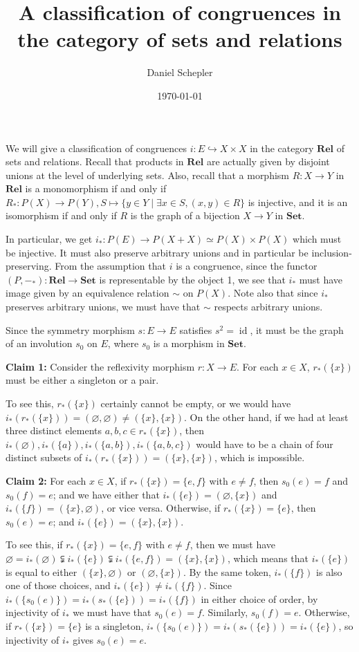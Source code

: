 \documentclass[a4paper,12pt,reqno]{amsart}
\title{A classification of congruences in the category of sets and relations}
\author{Daniel Schepler}
\date{\today}
\begin{document}
\maketitle

We will give a classification of congruences $i : E \hookrightarrow X \times X$ in the category $\mathbf{Rel}$ of sets and relations.  Recall that products in $\mathbf{Rel}$ are actually given by disjoint unions at the level of underlying sets.  Also, recall that a morphism $R : X \to Y$ in $\mathbf{Rel}$ is a monomorphism if and only if $R_* : P(X) \to P(Y), S \mapsto \{ y\in Y \mid \exists x\in S, (x, y) \in R \}$ is injective, and it is an isomorphism if and only if $R$ is the graph of a bijection $X \to Y$ in $\mathbf{Set}$.

In particular, we get $i_* : P(E) \to P(X + X) \simeq P(X) \times P(X)$ which must be injective.  It must also preserve arbitrary unions and in particular be inclusion-preserving.  From the assumption that $i$ is a congruence, since the functor $(P, {-}_*) : \mathbf{Rel} \to \mathbf{Set}$ is representable by the object 1, we see that $i_*$ must have image given by an equivalence relation $\sim$ on $P(X)$.  Note also that since $i_*$ preserves arbitrary unions, we must have that $\sim$ respects arbitrary unions.

Since the symmetry morphism $s : E \to E$ satisfies $s^2 = \operatorname{id}$, it must be the graph of an involution $s_0$ on $E$, where $s_0$ is a morphism in $\mathbf{Set}$.

{\bf Claim 1:} Consider the reflexivity morphism $r : X \to E$. For each $x \in X$, $r_*(\{ x \})$ must be either a singleton or a pair.

To see this, $r_*(\{ x \})$ certainly cannot be empty, or we would have $i_*(r_*(\{ x \})) = (\varnothing, \varnothing) \ne (\{ x \}, \{ x \})$.  On the other hand, if we had at least three distinct elements $a,b,c \in r_*(\{ x \})$, then $i_*(\varnothing), i_*(\{ a \}), i_*(\{ a, b \}), i_*(\{ a, b, c \})$ would have to be a chain of four distinct subsets of $i_*(r_*(\{ x \})) = (\{ x \}, \{ x \})$, which is impossible.

{\bf Claim 2:} For each $x \in X$, if $r_*(\{ x \}) = \{ e, f \}$ with $e \ne f$, then $s_0(e) = f$ and $s_0(f) = e$; and we have either that $i_*(\{e\}) = (\varnothing, \{ x \})$ and $i_*(\{f\}) = (\{ x \}, \varnothing)$, or vice versa.  Otherwise, if $r_*(\{ x \}) = \{ e \}$, then $s_0(e) = e$; and $i_*(\{ e \}) = (\{ x \}, \{ x \})$.

To see this, if $r_*(\{ x \}) = \{ e, f \}$ with $e\ne f$, then we must have $\varnothing = i_*(\varnothing) \subsetneqq i_*(\{ e \}) \subsetneqq i_*(\{ e, f \}) = (\{ x \}, \{ x \})$, which means that $i_*(\{ e \})$ is equal to either $(\{ x \}, \varnothing)$ or $(\varnothing, \{ x \})$.  By the same token, $i_*(\{ f \})$ is also one of those choices, and $i_*(\{ e \}) \ne i_*(\{ f \})$.  Since $i_*(\{ s_0(e) \}) = i_*(s_*(\{ e \})) = i_*(\{ f \})$ in either choice of order, by injectivity of $i_*$ we must have that $s_0(e) = f$.  Similarly, $s_0(f) = e$.  Otherwise, if $r_*(\{ x \}) = \{ e \}$ is a singleton, $i_*(\{ s_0(e) \}) = i_*(s_*(\{ e \})) = i_*(\{ e \})$, so injectivity of $i_*$ gives $s_0(e) = e$.
\end{document}
